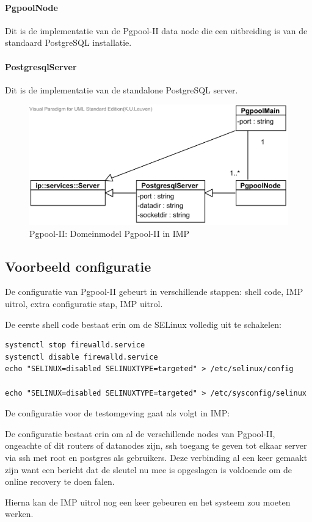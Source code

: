 \documentclass[]{article}
\begin{document}
	\paragraph{PgpoolNode} Dit is de implementatie van de Pgpool-II data node die een uitbreiding is van de standaard PostgreSQL installatie. 
		
	\paragraph{PostgresqlServer} Dit is de implementatie van de standalone PostgreSQL server. 

\begin{figure}[ht!]
\centering
\includegraphics[width=\linewidth]{img/Postgres-Domeinmodel.png}
\caption{Pgpool-II: Domeinmodel Pgpool-II in IMP}
\label{fig:imp-pgpool-domeinmodel}
\end{figure}

\subsection{Voorbeeld configuratie}
De configuratie van Pgpool-II gebeurt in verschillende stappen: shell code, IMP uitrol, extra configuratie stap, IMP uitrol. 

De eerste shell code bestaat erin om de SELinux volledig uit te schakelen: 
\begin{lstlisting}[frame=single, breaklines=true]
systemctl stop firewalld.service  
systemctl disable firewalld.service  
echo "SELINUX=disabled SELINUXTYPE=targeted" > /etc/selinux/config

echo "SELINUX=disabled SELINUXTYPE=targeted" > /etc/sysconfig/selinux
\end{lstlisting}

De configuratie voor de testomgeving gaat als volgt in IMP: 



De configuratie bestaat erin om al de verschillende nodes van Pgpool-II, ongeachte of dit routers of datanodes zijn, ssh toegang te geven tot elkaar server via ssh met root en postgres als gebruikers. Deze verbinding al een keer gemaakt zijn want een bericht dat de sleutel nu mee is opgeslagen is voldoende om de online recovery te doen falen. 

Hierna kan de IMP uitrol nog een keer gebeuren en het systeem zou moeten werken. 
\end{document}
